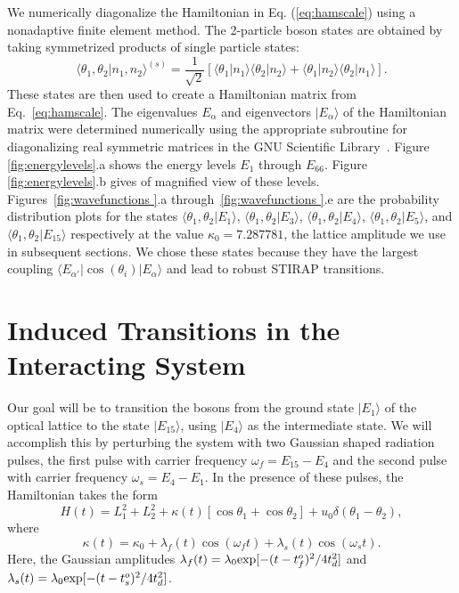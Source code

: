 \documentclass{article}
\begin{document}
We numerically diagonalize the Hamiltonian in Eq. (\ref{eq:hamscale}) using a nonadaptive finite element method. The 2-particle boson states are obtained by taking  symmetrized products  of single particle states:
%
\begin{equation}
{\langle}{\theta}_1,{\theta}_2\vert n_1,n_2{\rangle} ^{(s)}=\frac{1}{\sqrt{2}} 
[{\langle}{\theta}_1|n_1\rangle{\langle}{\theta}_2|n_2\rangle +{\langle}{\theta}_1|n_2\rangle{\langle}{\theta}_2|n_1\rangle ].
\label{eq:symm }
\end{equation}
%
These states are then used to create a Hamiltonian matrix from Eq.~\eqref{eq:hamscale}. The eigenvalues $E_{\alpha}$ and eigenvectors $\vert E_{\alpha}\rangle$ of the Hamiltonian matrix were determined numerically using the appropriate subroutine for diagonalizing real symmetric matrices in the GNU Scientific Library~\cite{galassi:gsl}. Figure \ref{fig:energylevels}.a shows the energy levels $E_1$ through $E_{66}$. Figure \ref{fig:energylevels}.b gives of magnified view of these levels. 
Figures~\ref{fig:wavefunctions }.a through~\ref{fig:wavefunctions }.e are the probability distribution plots for the states $\langle {\theta}_1, {\theta}_2 | E_1 \rangle$, $\langle {\theta}_1, {\theta}_2 | E_3 \rangle$, $\langle {\theta}_1, {\theta}_2 | E_4 \rangle$, $\langle {\theta}_1, {\theta}_2 | E_5 \rangle$, and $\langle {\theta}_1, {\theta}_2 | E_{15} \rangle$ respectively at the value  $\kappa_0=7.287781$, the lattice amplitude we use in subsequent sections. We chose these states because they have the largest coupling ${\langle}E_{\alpha'}|\cos({\theta}_i)|E_{\alpha}{\rangle}$ and lead to robust STIRAP transitions. 

%
%
\section{Induced Transitions in the Interacting System}
\label{sec:qmechint}
%
%
Our goal will be to transition the bosons from the ground state $|E_1{\rangle}$ of the optical lattice to the state $|E_{15}{\rangle}$, using $|E_4{\rangle}$ as the intermediate state. We will accomplish this  by perturbing the system with two Gaussian shaped radiation pulses, the first pulse with carrier frequency ${\omega}_f=E_{15}-E_4$ and the second pulse with carrier frequency ${\omega}_s=E_4-E_1$.  In the presence of these pulses, the Hamiltonian takes the form
%
\begin{equation}
H(t)=L^2_1 + L^2_2+\kappa(t) [ \cos{{\theta}_1}+ \cos{{\theta}_2}] + u_0 \delta({\theta}_1-{\theta}_2),
\end{equation}
%
where
%
\begin{equation}
\kappa(t) ={\kappa}_0+ {\lambda}_f(t) \cos({\omega}_ft)+{\lambda}_s(t) \cos({\omega}_st).
\end{equation}
%
Here, the Gaussian amplitudes $ {\lambda}_f(t) ={\lambda}_0{\rm exp}[-(t-t_f^o)^2/4t_d^2]$ and $ {\lambda}_s(t) ={\lambda}_0{\rm exp}[-(t-t_s^o)^2/4t_d^2]$.
 
\end{document}
